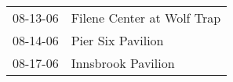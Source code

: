\begin{supertabular}{p{0.07\textwidth}p{0.23\textwidth}}
 08-13-06 &  Filene Center at Wolf Trap \\
 08-14-06 &           Pier Six Pavilion \\
 08-17-06 &          Innsbrook Pavilion \\
\end{supertabular}

